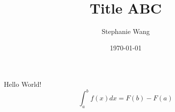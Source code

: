 \documentclass[12pt,a4paper]{article}
\begin{document}
\title{Title ABC}
\author{Stephanie Wang}
\date{\today}
\maketitle

Hello World!
\begin{equation}
\int_a^b f(x) dx = F(b) - F(a)
\end{equation}
\end{document}
